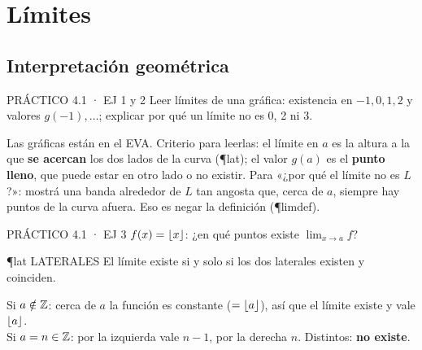 \chapter{Límites}

\section{Interpretación geométrica}

\begin{enunciado}{PRÁCTICO 4.1 · EJ 1 y 2}
Leer límites de una gráfica: existencia en $-1,0,1,2$ y valores $g(-1),\dots$; explicar por qué un límite no es 0, 2 ni 3.
\end{enunciado}
\begin{falta}
Las gráficas están en el EVA. Criterio para leerlas: el límite en $a$ es la altura a la que \textbf{se acercan} los dos lados de la curva (\P{lat}); el valor $g(a)$ es el \textbf{punto lleno}, que puede estar en otro lado o no existir. Para «¿por qué el límite no es $L$?»: mostrá una banda alrededor de $L$ tan angosta que, cerca de $a$, siempre hay puntos de la curva afuera. Eso es negar la definición (\P{limdef}).
\end{falta}

\begin{enunciado}{PRÁCTICO 4.1 · EJ 3}
$f(x)=\lfloor x\rfloor$: ¿en qué puntos existe $\lim_{x\to a}f$?
\end{enunciado}
\begin{uso}{\P{lat} LATERALES}
El límite existe si y solo si los dos laterales existen y coinciden.
\end{uso}
Si $a\notin\mathbb{Z}$: cerca de $a$ la función es constante ($=\lfloor a\rfloor$), así que el límite existe y vale $\lfloor a\rfloor$.\\
Si $a=n\in\mathbb{Z}$: por la izquierda vale $n-1$, por la derecha $n$. Distintos: \textbf{no existe}.

